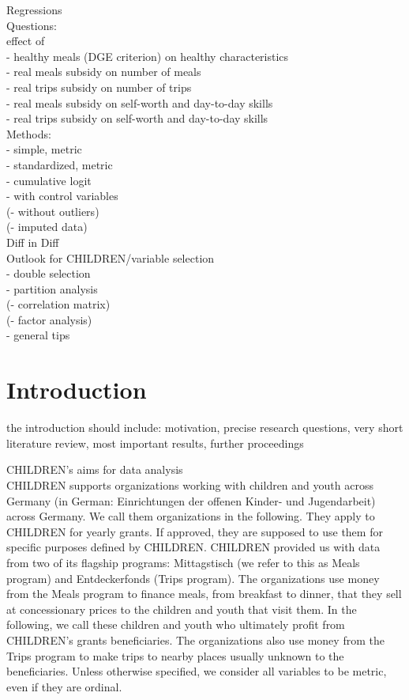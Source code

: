 \documentclass[12pt, a4paper, titlepage]{article}\usepackage[]{graphicx}\usepackage[]{color}
\begin{document}
Regressions\\

Questions:\\
effect of\\
- healthy meals (DGE criterion) on healthy characteristics\\
- real meals subsidy on number of meals\\
- real trips subsidy on number of trips\\
- real meals subsidy on self-worth and day-to-day skills\\
- real trips subsidy on self-worth and day-to-day skills\\

Methods:\\
- simple, metric\\
- standardized, metric\\
- cumulative logit\\
- with control variables\\
(- without outliers)\\
(- imputed data)\\

Diff in Diff\\

Outlook for CHILDREN/variable selection\\
- double selection \\
- partition analysis\\
(- correlation matrix)\\
(- factor analysis)\\
- general tips\\

\section{Introduction}

the introduction should include: motivation, precise research questions, very short literature review, most important results, further proceedings

CHILDREN's aims for data analysis\\ 
CHILDREN supports organizations working with children and youth across Germany (in German: Einrichtungen der offenen Kinder- und Jugendarbeit) across Germany. We call them organizations in the following. They apply to CHILDREN for yearly grants. If approved, they are supposed to use them for specific purposes defined by CHILDREN. CHILDREN provided us with data from two of its flagship programs: Mittagstisch (we refer to this as Meals program) and Entdeckerfonds (Trips program). The organizations use money from the Meals program to finance meals, from breakfast to dinner, that they sell at concessionary prices to the children and youth that visit them. In the following, we call these children and youth who ultimately profit from CHILDREN's grants beneficiaries. The organizations also use money from the Trips program to make trips to nearby places usually unknown to the beneficiaries.  
Unless otherwise specified, we consider all variables to be metric, even if they are ordinal. 
\end{document}
